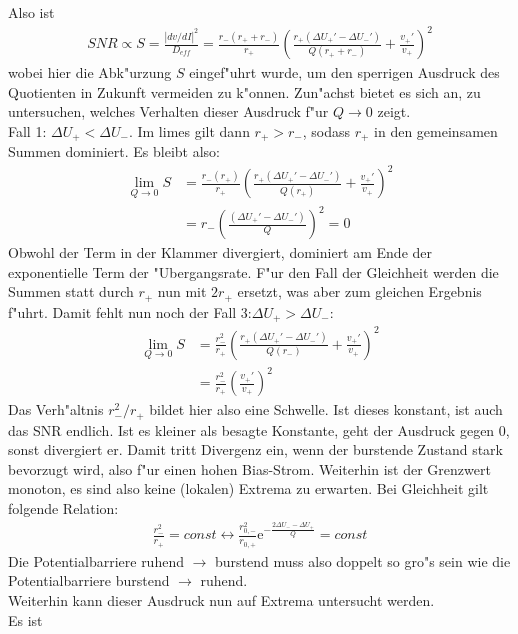 \documentclass[12pt,a4paper]{article}
\begin{document}
Also ist
\begin{eqnarray}
SNR\propto S=\frac{|dv/dI|^2}{D_{eff}}=\frac{r_-(r_++r_-)}{r_+}\left(\frac{r_+(\Delta U_+'-\Delta U_-')}{Q(r_++r_-)}+\frac{v_+'}{v_+}\right)^2
\end{eqnarray}
wobei hier die Abk"urzung $S$ eingef"uhrt wurde, um den sperrigen Ausdruck des Quotienten in Zukunft vermeiden zu k"onnen.
Zun"achst bietet es sich an, zu untersuchen, welches Verhalten dieser Ausdruck f"ur $Q\rightarrow0$ zeigt.\\
Fall 1: $\Delta U_+<\Delta U_-$. Im limes gilt dann $r_+>r_-$, sodass $r_+$ in den gemeinsamen Summen dominiert. Es bleibt also:
\begin{align*}
\lim_{Q\rightarrow0}S&=\frac{r_-(r_+)}{r_+}\left(\frac{r_+(\Delta U_+'-\Delta U_-')}{Q(r_+)}+\frac{v_+'}{v_+}\right)^2\\
&=r_-\left(\frac{(\Delta U_+'-\Delta U_-')}{Q}\right)^2=0
\end{align*}
Obwohl der Term in der Klammer divergiert, dominiert am Ende der exponentielle Term der "Ubergangsrate. F"ur den Fall der Gleichheit werden die Summen statt durch $r_+$ nun mit $2r_+$ ersetzt, was aber zum gleichen Ergebnis f"uhrt. Damit fehlt nun noch der Fall 3:$\Delta U_+>\Delta U_-$:
\begin{align*}
\lim_{Q\rightarrow0}S&=\frac{r_-^2}{r_+}\left(\frac{r_+(\Delta U_+'-\Delta U_-')}{Q(r_-)}+\frac{v_+'}{v_+}\right)^2\\
&=\frac{r_-^2}{r_+}\left(\frac{v_+'}{v_+}\right)^2
\end{align*}
Das Verh"altnis $r_-^2/r_+$ bildet hier also eine Schwelle. Ist dieses konstant, ist auch das SNR endlich. Ist es kleiner als besagte Konstante, geht der Ausdruck gegen 0, sonst divergiert er. Damit tritt Divergenz ein, wenn der burstende Zustand stark bevorzugt wird, also f"ur einen hohen Bias-Strom. Weiterhin ist der Grenzwert monoton, es sind also keine (lokalen) Extrema zu erwarten. Bei Gleichheit gilt folgende Relation:
\begin{eqnarray}
\frac{r_-^2}{r_+}=const\leftrightarrow \frac{r_{0,-}^2}{r_{0,+}}\text{e}^{-\frac{2\Delta U_--\Delta U_+}{Q}}=const
\end{eqnarray} 
Die Potentialbarriere ruhend $\rightarrow$ burstend muss also doppelt so gro"s sein wie die Potentialbarriere burstend $\rightarrow$ ruhend.\\
Weiterhin kann dieser Ausdruck nun auf Extrema untersucht werden.\\
Es ist 
\end{document}
